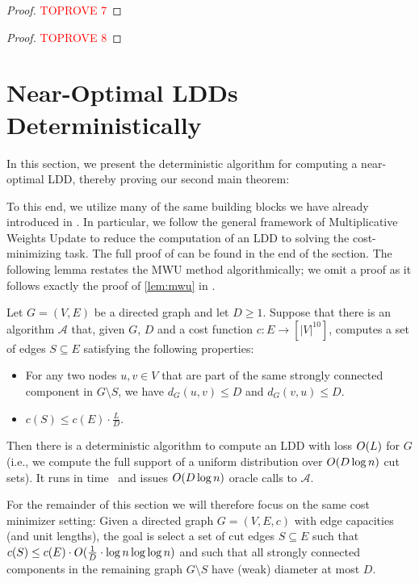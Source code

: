 \documentclass[letterpaper,11pt]{article}
\begin{document}
\lemLexpDiam*

\begin{proof}\textcolor{red}{TOPROVE 7}\end{proof}

\begin{proof}\textcolor{red}{TOPROVE 8}\end{proof} \section{Near-Optimal LDDs Deterministically} \label{sec:ldd-deterministic}
In this section, we present the deterministic algorithm for computing a near-optimal LDD, thereby proving our second main theorem:

\thmMainDet*

To this end, we utilize many of the same building blocks we have already introduced in . In particular, we follow the general framework of Multiplicative Weights Update to reduce the computation of an LDD to solving the cost-minimizing task. The full proof of  can be found in the end of the section. The following lemma restates the MWU method algorithmically; we omit a proof as it follows exactly the proof of \cref{lem:mwu} in . 

\begin{lemma}
Let $G = (V, E)$ be a directed graph and let $D \geq 1$. Suppose that there is an algorithm $\mathcal A$ that, given $G$, $D$ and a cost function $c : E \to [|V|^{10}]$, computes a set of edges $S \subseteq E$ satisfying the following properties:
\begin{itemize}
	\item For any two nodes $u, v \in V$ that are part of the same strongly connected component in $G \setminus S$, we have $d_G(u, v) \leq D$ and $d_G(v, u) \leq D$.
	\item $c(S) \leq c(E) \cdot \frac{L}{D}$.
\end{itemize}
Then there is a deterministic algorithm to compute an LDD with loss $O(L)$ for $G$ (i.e., we compute the full support of a uniform distribution over $O(D \log n)$ cut sets). It runs in time~ and issues $O(D \log n)$ oracle calls to $\mathcal A$.
\end{lemma}

For the remainder of this section we will therefore focus on the same cost minimizer setting: Given a directed graph $G = (V, E, c)$ with edge capacities (and unit lengths), the goal is select a set of cut edges $S \subseteq E$ such that $c(S) \leq c(E) \cdot O(\frac{1}{D} \cdot \log n \log\log n)$ and such that all strongly connected components in the remaining graph $G \setminus S$ have (weak) diameter at most $D$.
\end{document}
